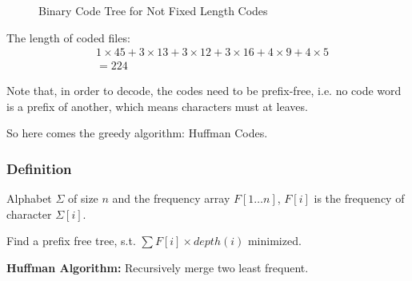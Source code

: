 \begin{figure}[H]
    \caption{Binary Code Tree for Not Fixed Length Codes}
    \centering
{}
\end{figure}

The length of coded files:
\begin{align*}
    & 1 \times 45 + 3 \times 13 + 3 \times 12 + 3 \times 16 + 4 \times 9 + 4 \times 5 \\
    &= 224
\end{align*}

Note that, in order to decode, the codes need to be prefix-free, i.e. no code word
is a prefix of another, which means characters must at leaves.

So here comes the greedy algorithm: Huffman Codes.

\subsubsection{Definition}

\AlgoInput Alphabet $\Sigma$ of size $n$ and the frequency array $F[1 \ldots n]$,
$F[i]$ is the frequency of character $\Sigma[i]$.

\AlgoOutput Find a prefix free tree, s.t. $\displaystyle\sum{F[i]\times depth(i)}$ minimized.

\vspace{0.1in}
\noindent \textbf{Huffman Algorithm:} Recursively merge two least frequent.

